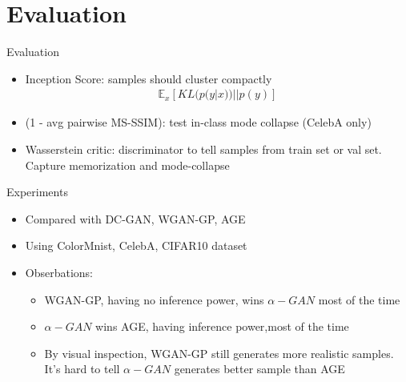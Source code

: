 \documentclass[compress]{beamer}
\newcommand{\expects}[2]{\mathbb{E}_{#1} \left[ #2 \right]}
\begin{document}
\section{Evaluation}
\begin{frame}[t]{Evaluation}
    \begin{itemize}
        \item Inception Score: samples should cluster compactly
            \begin{align*}
                \expects{x}{KL(p(y|x))||p(y)}
            \end{align*}
        \item (1 - avg pairwise MS-SSIM):  test in-class mode collapse (CelebA only)
        \item Wasserstein critic: discriminator to tell samples from train set or val set. Capture memorization and mode-collapse
    \end{itemize}
\end{frame}


\begin{frame}[t]{Experiments}
    \begin{itemize}
        \item Compared with DC-GAN, WGAN-GP, AGE
        \item Using ColorMnist, CelebA, CIFAR10 dataset
        \item Obserbations:
            \begin{itemize}
                \item WGAN-GP, having no inference power, wins $\alpha-GAN$ most of the time
                \item $\alpha-GAN$ wins AGE, having inference power,most of the time
                \item By visual inspection, WGAN-GP still generates more realistic samples. It's hard to tell $\alpha-GAN$ generates better sample than AGE
            \end{itemize}
    \end{itemize}
\end{frame}
\end{document}
